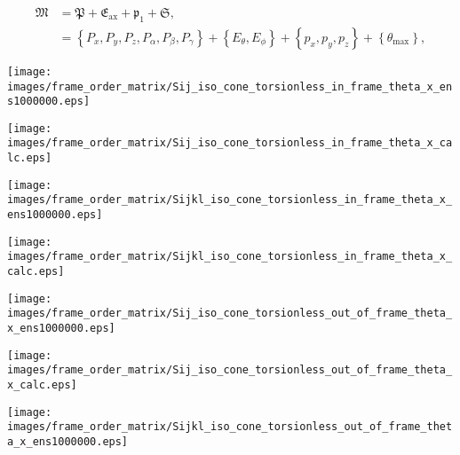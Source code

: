 \documentclass[a4paper,11pt,twoside,openright]{book}
\def\lthtmlcheckvsize{\ifdim\ht\sizebox<\vsize 
  \ifdim\wd\sizebox<\hsize\expandafter\hfill\fi \expandafter\vfill
  \else\expandafter\vss\fi}%
\begin{document}
{\newpage\clearpage
\setcounter{equation}{26}
%
\begin{subequations}\begin{align}
\mathfrak{M}&= \mathfrak{P}+ \mathfrak{E}_{\textrm{ax}}+ \mathfrak{p}_1+ \mathfrak{S}, \\
&= \left\{ P_x, P_y, P_z, P_\alpha , P_\beta , P_\gamma \right\}+ \left\{ E_\theta , E_\phi \right\}+ \left\{ p_x, p_y, p_z\right\}+ \left\{ \theta_{\textrm{max}}\right\} ,
\end{align}\end{subequations}%
\lthtmldisplayZ
\lthtmlcheckvsize\clearpage}

{\newpage\clearpage
{}%
\texttt{[image: images/frame\_order\_matrix/Sij\_iso\_cone\_torsionless\_in\_frame\_theta\_x\_ens1000000.eps]}%
\lthtmlpictureZ
\lthtmlcheckvsize\clearpage}

{\newpage\clearpage
{}%
\texttt{[image: images/frame\_order\_matrix/Sij\_iso\_cone\_torsionless\_in\_frame\_theta\_x\_calc.eps]}%
\lthtmlpictureZ
\lthtmlcheckvsize\clearpage}

{\newpage\clearpage
{}%
\texttt{[image: images/frame\_order\_matrix/Sijkl\_iso\_cone\_torsionless\_in\_frame\_theta\_x\_ens1000000.eps]}%
\lthtmlpictureZ
\lthtmlcheckvsize\clearpage}

{\newpage\clearpage
{}%
\texttt{[image: images/frame\_order\_matrix/Sijkl\_iso\_cone\_torsionless\_in\_frame\_theta\_x\_calc.eps]}%
\lthtmlpictureZ
\lthtmlcheckvsize\clearpage}

{\newpage\clearpage
{}%
\texttt{[image: images/frame\_order\_matrix/Sij\_iso\_cone\_torsionless\_out\_of\_frame\_theta\_x\_ens1000000.eps]}%
\lthtmlpictureZ
\lthtmlcheckvsize\clearpage}

{\newpage\clearpage
{}%
\texttt{[image: images/frame\_order\_matrix/Sij\_iso\_cone\_torsionless\_out\_of\_frame\_theta\_x\_calc.eps]}%
\lthtmlpictureZ
\lthtmlcheckvsize\clearpage}

{\newpage\clearpage
{}%
\texttt{[image: images/frame\_order\_matrix/Sijkl\_iso\_cone\_torsionless\_out\_of\_frame\_theta\_x\_ens1000000.eps]}%
\lthtmlpictureZ
\lthtmlcheckvsize\clearpage}
\end{document}
